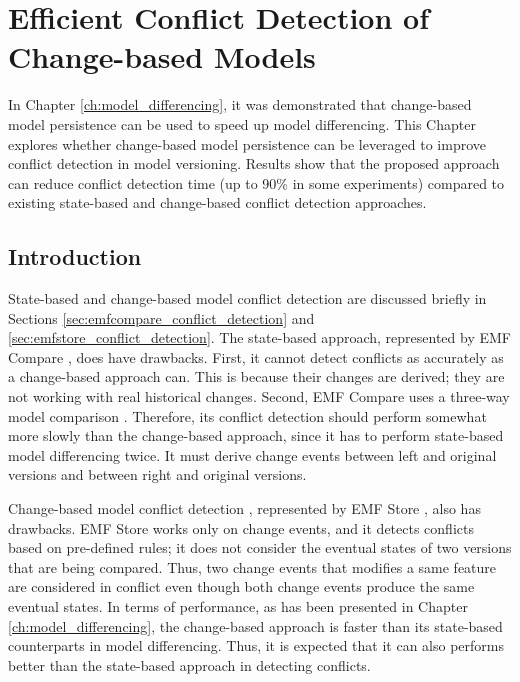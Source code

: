 \chapter{Efficient Conflict Detection of Change-based Models}
\label{ch:conflict_detection}

In Chapter \ref{ch:model_differencing}, it was demonstrated that change-based model persistence can be used to speed up model differencing. This Chapter explores whether change-based model persistence can be leveraged to improve conflict detection in model versioning. Results show that the proposed approach can reduce conflict detection time (up to 90\% in some experiments) compared to existing state-based and change-based conflict detection approaches.

\section{Introduction}
\label{sec:introduction_7}
State-based and change-based model conflict detection are discussed briefly in Sections \ref{sec:emfcompare_conflict_detection} and \ref{sec:emfstore_conflict_detection}. The state-based approach, represented by EMF Compare \cite{emfcompare2018developer}, does have drawbacks. First, it cannot detect conflicts as accurately as a change-based approach can. This is because their changes are derived; they are not working with real historical changes. Second, EMF Compare uses a three-way model comparison \cite{emfcompare2018developer}. Therefore, its conflict detection should perform somewhat more slowly than the change-based approach, since it has to perform state-based model differencing twice. It must derive change events between left and original versions and between right and original versions.

Change-based model conflict detection \cite{koegel2010operation}, represented by EMF Store \cite{emfstore2019what}, also has drawbacks. EMF Store works only on change events,  and it detects conflicts based on pre-defined rules; it does not consider the eventual states of two versions that are being compared. Thus, two change events that modifies a same feature are considered in conflict even though both change events produce the same eventual states. In terms of performance, as has been presented in Chapter \ref{ch:model_differencing}, the change-based approach is faster than its state-based counterparts in model differencing. Thus, it is expected that it can also performs better than the state-based approach in detecting conflicts.

